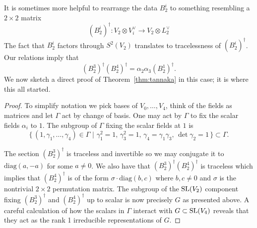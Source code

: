 \documentclass{amsart}
\theoremstyle{definition}
\begin{document}
It is sometimes more helpful to rearrange the data $B_2^i$ to something resembling a $2 \times 2$ matrix 
$$(B_2^i)^\dagger \colon V_2 \otimes V_i^\vee \longrightarrow V_2 \otimes L_2^\vee$$
The fact that $B_2^i$ factors through $S^2(V_2)$ translates to  tracelessness of $(B_2^i)^\dagger$.
Our relations imply that
$$(B_2^3)^\dagger (B_2^4)^\dagger = \alpha_2 \alpha_3 (B_2^1)^\dagger.$$
We now sketch a direct proof of Theorem~\ref{thm:tannaka} in this case; it is where this all started.
\begin{proof}
To simplify notation we pick bases of $V_0, \ldots, V_4$, think of the fields as matrices and let $\Gamma$ act by change of basis. 
One may act by $\Gamma$ to fix the scalar fields $\alpha_i$ to $1$.
The subgroup of $\Gamma$ fixing the scalar fields at $1$ is $$\{\,(1,\gamma_1, \ldots, \gamma_4) \in \Gamma \,\,|\,\, \gamma_1^2=1,\, \gamma_3^2=1,\, \gamma_4 = \gamma_1\gamma_3,\, \det\gamma_2=1\,\} \subset \Gamma.$$

The section $(B_2^3)^\dagger$ is traceless and invertible so we may conjugate it to $\text{diag}(a, -a)$ for some $a \neq 0$.
We also have that $(B_2^3)^\dagger (B_2^4)^\dagger$ is traceless which implies that $(B_2^4)^\dagger$ is of the form $\sigma \cdot \text{diag}(b,c)$ where $b,c \neq 0$ and $\sigma$ is the nontrivial $2\times2$ permutation matrix.
The subgroup of the $\operatorname{SL}(V_2)$ component fixing $(B_2^3)^\dagger$ and $(B_2^4)^\dagger$ up to scalar is now precisely $G$ as presented above.
A careful calculation of how the scalars in $\Gamma$ interact with $G \subset \operatorname{SL}(V_4)$ reveals that they act as the rank 1 irreducible representations of $G$.
\end{proof}





\end{document}
